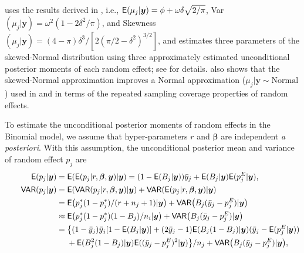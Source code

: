 \documentclass[article]{jss}
\begin{document}
\cite{kelly2014advances} uses  the results derived in \cite{azzalini1985class}, i.e., $\mathsf{E}(\mu_j\vert \boldsymbol{y}) =\phi+\omega\delta\sqrt{2/\pi}$, Var$(\mu_j\vert \boldsymbol{y})=\omega^2(1-2\delta^2/\pi)$, and Skewness$(\mu_j\vert \boldsymbol{y})=(4-\pi)\delta^3/[2(\pi/2-\delta^2)^{3/2}]$, and estimates three parameters of the skewed-Normal distribution using  three approximately estimated unconditional posterior  moments of each random effect; see \cite{kelly2014advances} for details. \cite{kelly2014advances} also shows that the skewed-Normal approximation improves a Normal approximation ($\mu_j\vert\boldsymbol{y}\sim \textrm{Normal}$) used in  \citet{tang2011} and \cite{morris2012} in terms of the repeated sampling coverage properties of random effects.

To estimate the unconditional posterior moments of random effects in the Binomial model, we assume that hyper-parameters $r$  and  $\boldsymbol{\beta}$ are independent \emph{a posteriori}. With this assumption,  the unconditional posterior mean and variance of random effect $p_j$ are
\begin{align}
\mathsf{E}(p_{j}\vert \boldsymbol{y}) &=\mathsf{E}(\mathsf{E}(p_{j}\vert r, \boldsymbol{\beta}, \boldsymbol{y})\vert\boldsymbol{y})=(1-\mathsf{E}(B_j\vert\boldsymbol{y}))\bar{y}_j + \mathsf{E}(B_j\vert  \boldsymbol{y})\mathsf{E}(p^E_{j}\vert  \boldsymbol{y}),\label{postmean_binom} \\
~~~~~~\mathsf{VAR}(p_{j}\vert \boldsymbol{y}) &=  \mathsf{E}(\mathsf{VAR}(p_{j}\vert r, \boldsymbol{\beta}, \boldsymbol{y})\vert \boldsymbol{y})+\mathsf{VAR}(\mathsf{E}(p_{j}\vert r, \boldsymbol{\beta},\boldsymbol{y})\vert \boldsymbol{y})\label{postvar}\\
&= \mathsf{E}\big(p^{\ast}_{j}(1-p^{\ast}_{j})/ (r+n_{j}+1)\vert  \boldsymbol{y}\big)+\mathsf{VAR}\big(B_{j}(\bar{y}_{j}-p^E_{j})\vert \boldsymbol{y}\big) \\
&\approx \mathsf{E}\big(p^{\ast}_{j}(1-p^{\ast}_{j})(1-B_{j})/n_{i}\vert \boldsymbol{y}\big)+\mathsf{VAR}\big(B_{j}(\bar{y}_{j}-p^E_{j})\vert \boldsymbol{y}\big)\label{taylor}\\
&=\big\{(1-\bar{y}_j)\bar{y}_j[1-\mathsf{E}(B_j\vert \boldsymbol{y})]+(2\bar{y}_j-1)\mathsf{E}(B_j(1-B_j) \vert \boldsymbol{y})(\bar{y}_j-\mathsf{E}(p^E_j\vert\boldsymbol{y}))\nonumber\\
&~~~~+\mathsf{E}(B_j^2(1-B_j) \vert \boldsymbol{y})\mathsf{E}((\bar{y}_j-p^E_j)^2\vert\boldsymbol{y})\big\}/n_j+\mathsf{VAR}\big(B_{j}(\bar{y}_{j}-p^E_{j})\vert \boldsymbol{y}\big),\label{approximate_var}
\end{align}
\end{document}
